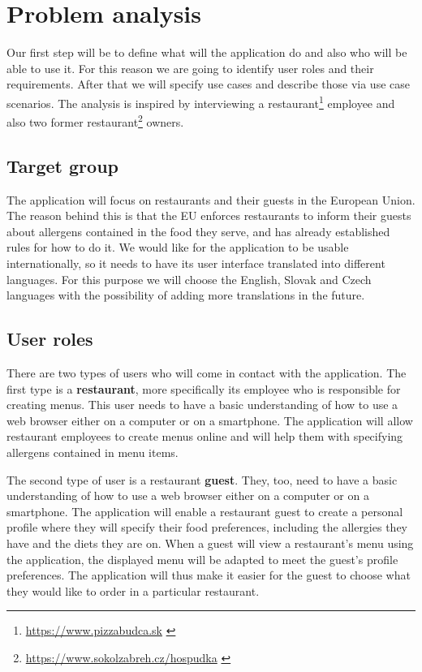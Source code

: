 \chapter{Problem analysis}
Our first step will be to define what will the application do and also who will be able to use it.
For this reason we are going to identify user roles and their requirements. 
After that we will specify use cases and describe those via use case scenarios.
The analysis is inspired by interviewing a restaurant\footnote{\url{https://www.pizzabudca.sk}  \label{fnlabel}} employee and also two former restaurant\footnote{\url{https://www.sokolzabreh.cz/hospudka}  \label{fnlabel}} owners.

\section{Target group}
The application will focus on restaurants and their guests in the European Union.
The reason behind this is that the EU enforces restaurants to inform their guests about allergens contained in the food they serve, and has already established rules for how to do it.
We would like for the application to be usable internationally, so it needs to have its user interface translated into different languages.
For this purpose we will choose the English, Slovak and Czech languages with the possibility of adding more translations in the future.


\section{User roles}
There are two types of users who will come in contact with the application.
The first type is a \textbf{restaurant}, more specifically its employee who is responsible for creating menus.
This user needs to have a basic understanding of how to use a web browser either on a computer or on a smartphone.
The application will allow restaurant employees to create menus online and will help them with specifying allergens contained in menu items.

The second type of user is a restaurant \textbf{guest}.
They, too, need to have a basic understanding of how to use a web browser either on a computer or on a smartphone.
The application will enable a restaurant guest to create a personal profile where they will specify their food preferences, including the allergies they have and the diets they are on.
When a guest will view a restaurant's menu using the application, the displayed menu will be adapted to meet the guest's profile preferences.
The application will thus make it easier for the guest to choose what they would like to order in a particular restaurant.

